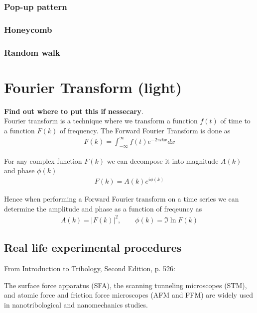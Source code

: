 \subsubsection{Pop-up pattern}
\subsubsection{Honeycomb}
\subsubsection{Random walk}







\section{Fourier Transform (light)}

\textbf{Find out where to put this if nessecary}. \\

Fourier transform is a technique where we transform a function $f(t)$ of time to
a function $F(k)$ of frequency. The Forward Fourier Transform is done as
\begin{align*}
  F(k) = \int_{-\infty}^\infty f(t) e^{-2\pi ikx} dx
\end{align*}

For any complex function $F(k)$ we can decompose it into magnitude $A(k)$ and
phase $\phi(k)$
\begin{align*}
  F(k) = A(k) e^{i \phi(k)}
\end{align*}

Hence when performing a Forward Fourier transform on a time series we can
determine the amplitude and phase as a function of freqeuncy as 
\begin{align*}
  A(k) = |F(k)|^2, \qquad \phi(k) = \Im{\ln{F(k)}}
\end{align*}





\subsection{Real life experimental procedures}
From Introduction to Tribology, Second Edition, p. 526: \par The surface force
apparatus (SFA), the scanning tunneling microscopes (STM), and atomic force and
friction force microscopes (AFM and FFM) are widely used in nanotribological and
nanomechanics studies.



